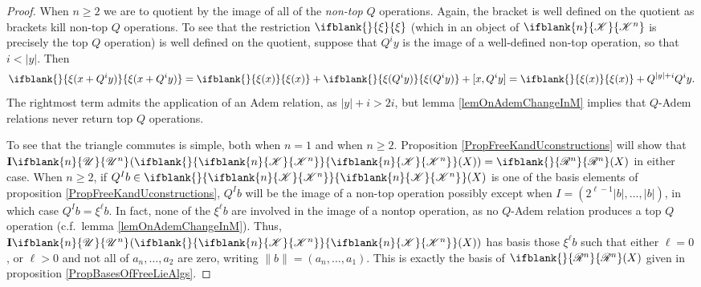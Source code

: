 \documentclass[10pt]{article}
\newcommand{\PRLie}[1]{\scrR^{#1}}%
\newcommand{\LL}[1]{\ifblank{#1}{\scrK}{\scrK^{#1}}}
\newcommand{\nontop}[1]{\ifblank{#1}{\scrU}{\scrU^{#1}}}
\newcommand{\iteratedrestn}[2]{\xi^{#2}{#1}}
\newcommand{\Ind}[2][]{\mathbf{I}{#2}_{#1}}%
\newcommand{\Fr}[2][]{\ifblank{#1}{#2}{#2_{#1}}}
\newcommand{\restn}[2][]{\ifblank{#1}{\xi{#2}}{\xi_{#1}{#2}}}%
\renewcommand{\Q}{Q}
\begin{document}
\begin{DiagramOfFunctors}
\begin{proof}
When $n\geq2$  we are to quotient by the image of all of the \emph{non-top} $\Q$ operations. Again, the bracket is well defined on the quotient as brackets kill non-top $\Q$ operations. To see that the restriction $\restn{}$ (which in an object of $\LL{n}$ is precisely the top $\Q$ operation) is well defined on the quotient, %
suppose that $\Q^iy$ is the image of a well-defined non-top operation, so that $i<|y|$. Then
\[\restn{(x+\Q^iy)}=\restn{(x)}+\restn{(\Q^iy)}+[x,\Q^iy]=\restn{(x)}+\Q^{|y|+i}\Q^iy.\]
The rightmost term admits the application of an Adem relation, as $|y|+i>2i$, but lemma \ref{lemOnAdemChangeInM} implies that $\Q$-Adem relations never return top $\Q$ operations.

To see that the triangle commutes is simple, both when $n=1$ and when $n\geq2$. %
Proposition \ref{PropFreeKandUconstructions} will show that $\Ind{\nontop{n}}(\Fr{\LL{n}}(X))=\Fr{\PRLie{n}}(X)$ in either case. When $n\geq2$, if $Q^Ib\in\Fr{\LL{n}}(X)$ is one of the basis elements of proposition \ref{PropFreeKandUconstructions}, $\Q^Ib$ will be the image of a non-top operation possibly except when $I=(2^{\ell-1}|b|,\ldots,|b|)$, in which case $\Q^Ib=\iteratedrestn{b}{\ell}$. In fact, none of the $\iteratedrestn{b}{\ell}$ are involved in the image of a nontop operation, as no $\Q$-Adem relation produces a top $\Q$ operation (c.f.\ lemma \ref{lemOnAdemChangeInM}). Thus, $\Ind{\nontop{n}}(\Fr{\LL{n}}(X))$ has basis those $\iteratedrestn{b}{\ell}$ such that either $\ell=0$, or $\ell>0$ and not all of $a_n,\ldots,a_2$ are zero, writing $\|b\|=(a_n,\ldots,a_1)$. This is exactly the basis of $\Fr{\PRLie{n}}(X)$ given in proposition \ref{PropBasesOfFreeLieAlgs}.


\end{proof}
\end{DiagramOfFunctors}
\end{document}
